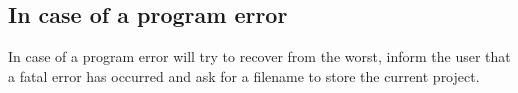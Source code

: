 \subsection{In case of a program error}%
\label{basic.error}

In case of a program error \period will try to recover from the
worst, inform the user that a fatal error has occurred and ask for a
filename to store the current project.


